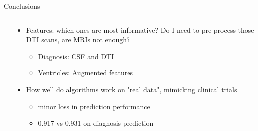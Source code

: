 \documentclass[8pt,xcolor=table,aspectratio=169]{beamer}
\begin{document}
\begin{frame}{Conclusions}
\begin{columns}[t]
\begin{column}[t]{0.5\textwidth}
\begin{itemize}
  \vspace{2em}
\end{itemize}  
  
\end{column}
\begin{column}[t]{0.5\textwidth}
\begin{itemize}
%   
  
   \item Features: which ones are most informative? Do I need to pre-process those DTI scans, are MRIs not enough?
   
 \begin{itemize}
 \item Diagnosis: CSF and DTI
 \item Ventricles: Augmented features
\end{itemize}  
  
  \vspace{2em}
 
  
   \item How well do algorithms work on "real data", mimicking clinical trials
 \begin{itemize}
  \item minor loss in prediction performance
  \item  0.917 vs 0.931 on diagnosis prediction
\end{itemize}   
  
 \end{itemize}

\end{column}
\end{columns} 
 
 
 
\end{frame}
\end{document}
